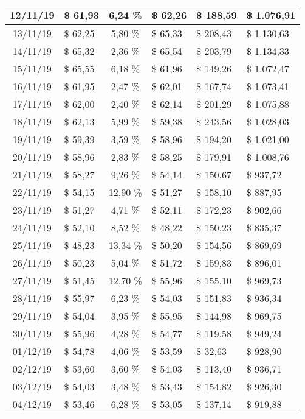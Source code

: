 \begin{center}
\begin{small}
\begin{longtable}{|c|l|c|l|l|l|}
12/11/19 & \$ 61,93 & 6,24 \% & \$ 62,26 & \$ 188,59 & \$ 1.076,91 \\ \hline
13/11/19 & \$ 62,25 & 5,80 \% & \$ 65,33 & \$ 208,43 & \$ 1.130,63 \\ \hline
14/11/19 & \$ 65,32 & 2,36 \% & \$ 65,54 & \$ 203,79 & \$ 1.134,33 \\ \hline
15/11/19 & \$ 65,55 & 6,18 \% & \$ 61,96 & \$ 149,26 & \$ 1.072,47 \\ \hline
16/11/19 & \$ 61,95 & 2,47 \% & \$ 62,01 & \$ 167,74 & \$ 1.073,41 \\ \hline
17/11/19 & \$ 62,00 & 2,40 \% & \$ 62,14 & \$ 201,29 & \$ 1.075,88 \\ \hline
18/11/19 & \$ 62,13 & 5,99 \% & \$ 59,38 & \$ 243,56 & \$ 1.028,03 \\ \hline
19/11/19 & \$ 59,39 & 3,59 \% & \$ 58,96 & \$ 194,20 & \$ 1.021,00 \\ \hline
20/11/19 & \$ 58,96 & 2,83 \% & \$ 58,25 & \$ 179,91 & \$ 1.008,76 \\ \hline
21/11/19 & \$ 58,27 & 9,26 \% & \$ 54,14 & \$ 150,67 & \$ 937,72 \\ \hline
22/11/19 & \$ 54,15 & 12,90 \% & \$ 51,27 & \$ 158,10 & \$ 887,95 \\ \hline
23/11/19 & \$ 51,27 & 4,71 \% & \$ 52,11 & \$ 172,23 & \$ 902,66 \\ \hline
24/11/19 & \$ 52,10 & 8,52 \% & \$ 48,22 & \$ 150,23 & \$ 835,37 \\ \hline
25/11/19 & \$ 48,23 & 13,34 \% & \$ 50,20 & \$ 154,56 & \$ 869,69 \\ \hline
26/11/19 & \$ 50,23 & 5,04 \% & \$ 51,72 & \$ 159,83 & \$ 896,01 \\ \hline
27/11/19 & \$ 51,45 & 12,70 \% & \$ 55,96 & \$ 155,10 & \$ 969,73 \\ \hline
28/11/19 & \$ 55,97 & 6,23 \% & \$ 54,03 & \$ 151,83 & \$ 936,34 \\ \hline
29/11/19 & \$ 54,04 & 3,95 \% & \$ 55,95 & \$ 144,98 & \$ 969,75 \\ \hline
30/11/19 & \$ 55,96 & 4,28 \% & \$ 54,77 & \$ 119,58 & \$ 949,24 \\ \hline
01/12/19 & \$ 54,78 & 4,06 \% & \$ 53,59 & \$ 32,63 & \$ 928,90 \\ \hline
02/12/19 & \$ 53,60 & 3,60 \% & \$ 54,03 & \$ 113,40 & \$ 936,71 \\ \hline
03/12/19 & \$ 54,03 & 3,48 \% & \$ 53,43 & \$ 154,82 & \$ 926,30 \\ \hline
04/12/19 & \$ 53,46 & 6,28 \% & \$ 53,05 & \$ 137,14 & \$ 919,88 \\ \hline

\end{longtable}
\end{small}
\end{center}
